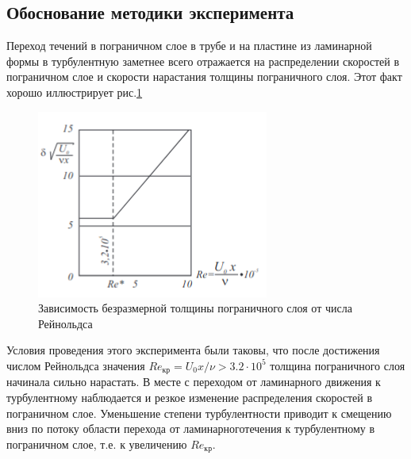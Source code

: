 \documentclass[12pt,a4paper]{article}
\begin{document}
\subsection*{Обоснование методики эксперимента}
\par Переход течений в пограничном слое в трубе и на пластине из ламинарной формы в турбулентную заметнее всего отражается на распределении скоростей в пограничном слое и скорости нарастания толщины пограничного слоя. Этот факт хорошо иллюстрирует рис.\ref{pic2}
\begin{figure}
	\includegraphics[width=1 \linewidth]{2.png}
	\caption{Зависимость безразмерной толщины пограничного слоя от числа Рейнольдса}
	\label{pic2}
\end{figure}
Условия проведения этого эксперимента были таковы, что после достижения числом Рейнольдса значения $Re_{кр} = U_0x/\nu > 3.2 \cdot 10^5$ толщина пограничного слоя начинала сильно нарастать. В месте с переходом от ламинарного движения к турбулентному наблюдается и резкое изменение распределения скоростей в пограничном слое. Уменьшение степени турбулентности приводит к смещению вниз по потоку области перехода от ламинарноготечения к турбулентному в пограничном слое, т.е. к увеличению $Re_{кр}$.
\end{document}
